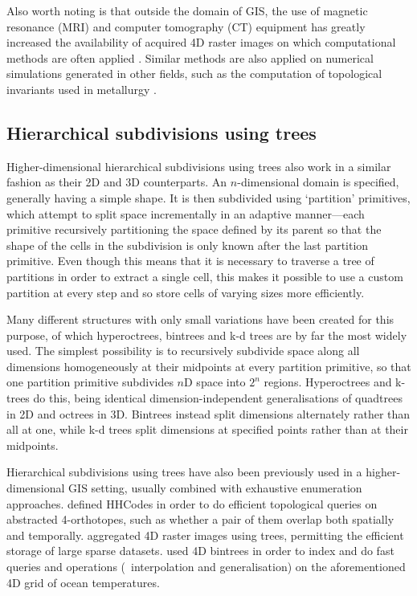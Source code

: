 Also worth noting is that outside the domain of GIS, the use of magnetic resonance (MRI) and computer tomography (CT) equipment has greatly increased the availability of acquired 4D raster images on which computational methods are often applied \citep{LorenzoValdes04}.
Similar methods are also applied on numerical simulations generated in other fields, such as the computation of topological invariants used in metallurgy \citep{Kaczynski04}.

\subsection{Hierarchical subdivisions using trees}
\label{ss:hierarchical-subdivisions}

Higher-dimensional hierarchical subdivisions using trees also work in a similar fashion as their 2D and 3D counterparts.
An $n$-dimensional domain is specified, generally having a simple shape.
It is then subdivided using `partition' primitives, which attempt to split space incrementally in an adaptive manner---each primitive recursively partitioning the space defined by its parent so that the shape of the cells in the subdivision is only known after the last partition primitive.
Even though this means that it is necessary to traverse a tree of partitions in order to extract a single cell, this makes it possible to use a custom partition at every step and so store cells of varying sizes more efficiently.

Many different structures with only small variations have been created for this purpose, of which hyperoctrees, bintrees and k-d trees are by far the most widely used.
The simplest possibility is to recursively subdivide space along all dimensions homogeneously at their midpoints at every partition primitive, so that one partition primitive subdivides $n$D space into $2^n$ regions.
Hyperoctrees \citep{Yau83} and k-trees \citep{Jackins83} do this, being identical dimension-independent generalisations of quadtrees \citep{Finkel74} in 2D and octrees \citep{Meagher80} in 3D.
Bintrees \citep{Samet85} instead split dimensions alternately rather than all at one, while k-d trees split dimensions at specified points rather than at their midpoints.

Hierarchical subdivisions using trees have also been previously used in a higher-dimensional GIS setting, usually combined with exhaustive enumeration approaches.
\citet{Varma90} defined HHCodes in order to do efficient topological queries on abstracted 4-orthotopes, such as whether a pair of them overlap both spatially and temporally.
\citet{Oconaill92} aggregated 4D raster images using trees, permitting the efficient storage of large sparse datasets.
\citet{Mason94} used 4D bintrees in order to index and do fast queries and operations (\eg\ interpolation and generalisation) on the aforementioned 4D grid of ocean temperatures.


